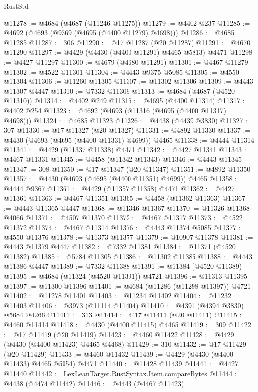\begin{lexlean}{RustStd}
\begin{coremodule}
{\begin{coremodule}
{{{{{{{{{{{{{{{{{{{{{{{{{{{{{{{{{{{{{{{{{{{{{{{{{{{{{{{{{{{{{{{{{{{{@11278 := @4684 (@4687 (@11246 @11275))
@11279 := @4402 @237
@11285 := @4692 (@4693 (@9369 (@4695 (@4400 @11279) @4698)))
@11286 := @4685 @11285
@11287 := 306
@11290 := @17 @11287 (@20 @11287)
@11291 := @4670 @11290
@11297 := @4429 (@4430 (@4400 @11291) @4465 @5813) @4471
@11298 := @4427 @11297
@11300 := @4679 (@4680 @11291)
@11301 := @4467 @11279
@11302 := @4522 @11301
@11304 := @4443 @9375 @5085
@11305 := @4550 @11304
@11306 := @11260 @11305
@11307 := @11302 @11306
@11309 := @4443 @11307 @4447
@11310 := @7332 @11309
@11313 := @4684 (@4687 (@4520 @11310))
@11314 := @4402 @249
@11316 := @4695 (@4400 @11314)
@11317 := @4402 @254
@11323 := @4692 (@4693 (@11316 (@4695 (@4400 @11317) @4698)))
@11324 := @4685 @11323
@11326 := @4438 (@4439 @3830)
@11327 := 307
@11330 := @17 @11327 (@20 @11327)
@11331 := @4892 @11330
@11337 := @4430 (@4693 (@4695 (@4400 @11331) @4699)) @4465
@11338 := @4444 @11314
@11341 := @4429 (@11337 @11338) @4471
@11342 := @4427 @11341
@11343 := @4467 @11331
@11345 := @4458 (@11342 @11343)
@11346 := @4443 @11345
@11347 := 308
@11350 := @17 @11347 (@20 @11347)
@11351 := @4892 @11350
@11357 := @4430 (@4693 (@4695 (@4400 @11351) @4699)) @4465
@11358 := @4444 @9367
@11361 := @4429 (@11357 @11358) @4471
@11362 := @4427 @11361
@11363 := @4467 @11351
@11365 := @4458 (@11362 @11363)
@11367 := @4443 @11365 @4447
@11368 := @11346 @11367
@11370 := @11326 @11368 @4066
@11371 := @4507 @11370
@11372 := @4467 @11317
@11373 := @4522 @11372
@11374 := @4467 @11314
@11376 := @4443 @11374 @5085
@11377 := @4550 @11376
@11378 := @11373 @11377
@11379 := @10907 @11378
@11381 := @4443 @11379 @4447
@11382 := @7332 @11381
@11384 := @11371 (@4520 @11382)
@11385 := @5784 @11305
@11386 := @11302 @11385
@11388 := @4443 @11386 @4447
@11389 := @7332 @11388
@11391 := @11384 (@4520 @11389)
@11395 := @4684 (@11324 (@4520 @11391)) @4721
@11396 := @11313 @11395
@11397 := @11300 @11396
@11401 := @4684 (@11286 (@11298 @11397)) @4721
@11402 := @11278 @11401
@11403 := @11234 @11402
@11404 := @11232 @11403
@11406 := @3973 (@11114 @11404)
@11410 := @4391 (@4394 @3830) @5684 @4266
@11411 := 313
@11414 := @17 @11411 (@20 @11411)
@11415 := @4460 @11414
@11418 := @4430 (@4400 @11415) @4465
@11419 := 309
@11422 := @17 @11419 (@20 @11419)
@11423 := @4460 @11422
@11428 := @4429 (@4430 (@4400 @11423) @4465 @4468)
@11429 := 310
@11432 := @17 @11429 (@20 @11429)
@11433 := @4460 @11432
@11439 := @4429 (@4430 (@4400 @11433) @4465 @5054) @4471
@11440 := @11428 @11439
@11441 := @4427 @11440
@11442 := LexLeanTarget.RustSyntax.Item.compareBytes
@11444 := @4438 (@4474 @11442)
@11446 := @4443 (@4467 @11423)
}}}}}}}}}}}}}}}}}}}}}}}}}}}}}}}}}}}}}}}}}}}}}}}}}}}}}}}}}}}}}}}}}}}}
\end{coremodule}}
\end{coremodule}
\end{lexlean}
